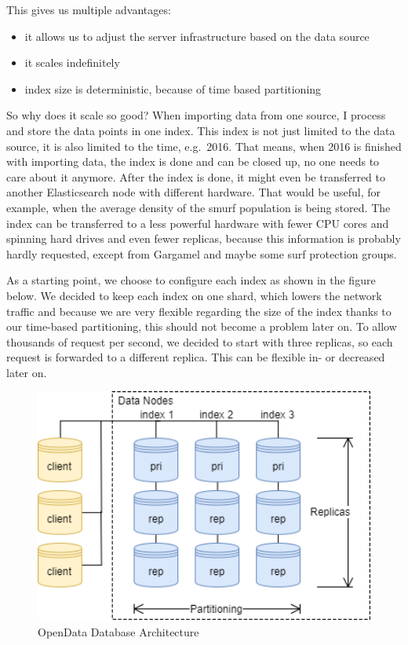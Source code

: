 This gives us multiple advantages:

\begin{itemize}
\tightlist
\item
  it allows us to adjust the server infrastructure based on the data
  source
\item
  it scales indefinitely
\item
  index size is deterministic, because of time based partitioning
\end{itemize}

So why does it scale so good? When importing data from one source, I
process and store the data points in one index. This index is not just
limited to the data source, it is also limited to the time, e.g.~2016.
That means, when 2016 is finished with importing data, the index is done
and can be closed up, no one needs to care about it anymore. After the
index is done, it might even be transferred to another Elasticsearch
node with different hardware. That would be useful, for example, when
the average density of the smurf population is being stored. The index
can be transferred to a less powerful hardware with fewer CPU cores and
spinning hard drives and even fewer replicas, because this information
is probably hardly requested, except from Gargamel and maybe some surf
protection groups.

As a starting point, we choose to configure each index as shown in the
figure below. We decided to keep each index on one shard, which lowers
the network traffic and because we are very flexible regarding the size
of the index thanks to our time-based partitioning, this should not
become a problem later on. To allow thousands of request per second, we
decided to start with three replicas, so each request is forwarded to a
different replica. This can be flexible in- or decreased later on.

\begin{figure}[htbp]
	\centering
	\includegraphics[width=1.00\textwidth]{images/07_database_architecture.png}
	\caption{OpenData Database Architecture}
	\label{fig:db-architecture}
\end{figure}


